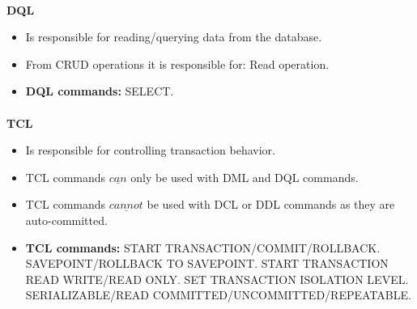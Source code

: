 \paragraph{} \textbf{\acf{DQL}}
\begin{itemize}
	\item Is responsible for reading/querying data from the database.
	\item From \acs{CRUD} operations it is responsible for: Read operation.
	\item \textbf{\acs{DQL} commands:}
	\subitem SELECT.
\end{itemize}
\paragraph{} \textbf{\acf{TCL}}
\begin{itemize}
	\item Is responsible for controlling transaction behavior.
	\item \acs{TCL} commands $\underline{can}$ only be used with \acs{DML} and \acs{DQL} commands.
	\item \acs{TCL} commands $\underline{cannot}$ be used with \acs{DCL} or \acs{DDL} commands as they are auto-committed.
	\item \textbf{\acs{TCL} commands:}
	\subitem START TRANSACTION/COMMIT/ROLLBACK.
	\subitem SAVEPOINT/ROLLBACK TO SAVEPOINT.
	\subitem START TRANSACTION READ WRITE/READ ONLY.
	\subitem SET TRANSACTION ISOLATION LEVEL.
	\subsubitem SERIALIZABLE/READ COMMITTED/UNCOMMITTED/REPEATABLE.
\end{itemize}